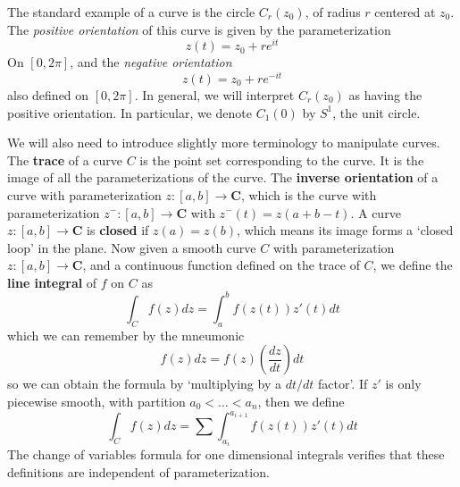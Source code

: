 \begin{example}
    The standard example of a curve is the circle $C_r(z_0)$, of radius $r$ centered at $z_0$. The {\it positive orientation} of this curve is given by the parameterization
    \[ z(t) = z_0 + re^{it} \]
    On $[0,2\pi]$, and the {\it negative orientation}
    \[ z(t) = z_0 + re^{-it} \]
    also defined on $[0,2\pi]$. In general, we will interpret $C_r(z_0)$ as having the positive orientation. In particular, we denote $C_1(0)$ by $S^1$, the unit circle.
\end{example}

We will also need to introduce slightly more terminology to manipulate curves. The {\bf trace} of a curve $C$ is the point set corresponding to the curve. It is the image of all the parameterizations of the curve. The {\bf inverse orientation} of a curve with parameterization $z: [a,b] \to \mathbf{C}$, which is the curve with parameterization $z^-: [a,b] \to \mathbf{C}$ with $z^-(t) = z(a+b-t)$. A curve $z: [a,b] \to \mathbf{C}$ is {\bf closed} if $z(a) = z(b)$, which means its image forms a `closed loop' in the plane. Now given a smooth curve $C$ with parameterization $z: [a,b] \to \mathbf{C}$, and a continuous function defined on the trace of $C$, we define the {\bf line integral} of $f$ on $C$ as
%
\[ \int_C f(z) dz = \int_a^b f(z(t)) z'(t) dt \]
%
which we can remember by the mneumonic
%
\[ f(z) dz = f(z) \left( \frac{dz}{dt} \right) dt \]
%
so we can obtain the formula by `multiplying by a $dt/dt$ factor'. If $z'$ is only piecewise smooth, with partition $a_0 < \dots < a_n$, then we define
%
\[ \int_C f(z) dz = \sum \int_{a_i}^{a_{i+1}} f(z(t)) z'(t) dt \]
%
The change of variables formula for one dimensional integrals verifies that these definitions are independent of parameterization.

